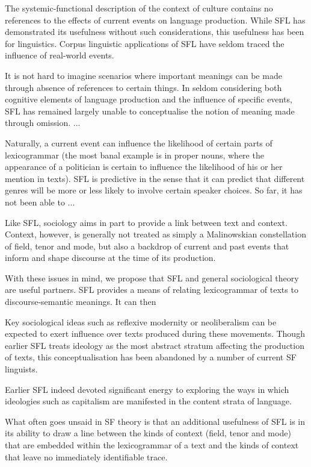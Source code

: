    The systemic-functional description of the context of culture contains no references to the effects of current events on language production. While SFL has demonstrated its usefulness without such considerations, this usefulness has been for linguistics. Corpus linguistic applications of SFL have seldom traced the influence of real-world events.

            It is not hard to imagine scenarios where important meanings can be made through absence of references to certain things. In seldom considering both cognitive elements of language production and the influence of specific events, SFL has remained largely unable to conceptualise the notion of meaning made through omission. ...

            Naturally, a current event can influence the likelihood of certain parts of lexicogrammar (the most banal example is in proper nouns, where the appearance of a politician is certain to influence the likelihood of his or her mention in texts).  SFL is predictive in the sense that it can predict that different genres will be more or less likely to involve certain speaker choices. So far, it has not been able to ...

    Like SFL, sociology aims in part to provide a link between text and context. Context, however, is generally not treated as simply a Malinowskian constellation of field, tenor and mode, but also a backdrop of current and past events that inform and shape discourse at the time of its production.

    With these issues in mind, we propose that SFL and general sociological theory are useful partners. SFL provides a means of relating lexicogrammar of texts to discourse-semantic meanings. It can then 

            Key sociological ideas such as reflexive modernity or neoliberalism can be expected to exert influence over texts produced during these movements. Though earlier SFL treats ideology as the most abstract stratum affecting the production of texts, this conceptualisation has been abandoned by a number of current SF linguists.

            Earlier SFL indeed devoted significant energy to exploring the ways in which ideologies such as capitalism are manifested in the content strata of language.

    What often goes unsaid in SF theory is that an additional usefulness of SFL is in its ability to draw a line between the kinds of context (field, tenor and mode) that are embedded within the lexicogrammar of a text and the kinds of context that leave no immediately identifiable trace.

